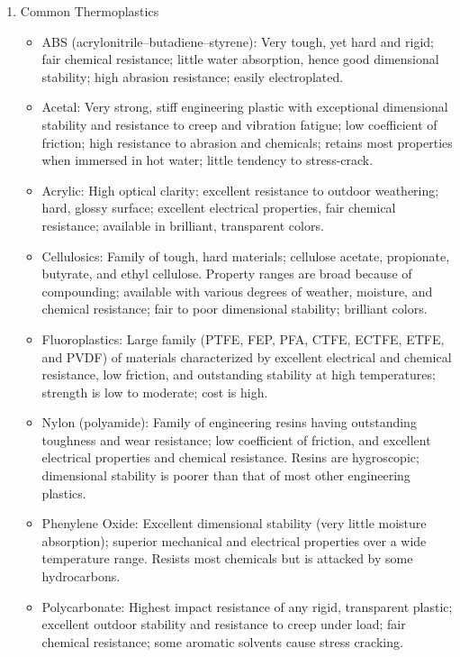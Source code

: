 \documentclass[a4paper,openany,nobib]{tufte-book}
\begin{document}
\begin{enumerate}
\item Common Thermoplastics
\label{common-thermoplastics}
\begin{itemize}
\item ABS (acrylonitrile--butadiene--styrene): Very tough, yet hard and
rigid; fair chemical resistance; little water absorption, hence good
dimensional stability; high abrasion resistance; easily electroplated.

\item Acetal: Very strong, stiff engineering plastic with exceptional
dimensional stability and resistance to creep and vibration fatigue;
low coefficient of friction; high resistance to abrasion and
chemicals; retains most properties when immersed in hot water; little
tendency to stress-crack.

\item Acrylic: High optical clarity; excellent resistance to outdoor
weathering; hard, glossy surface; excellent electrical properties,
fair chemical resistance; available in brilliant, transparent colors.

\item Cellulosics: Family of tough, hard materials; cellulose acetate,
propionate, butyrate, and ethyl cellulose. Property ranges are broad
because of compounding; available with various degrees of weather,
moisture, and chemical resistance; fair to poor dimensional stability;
brilliant colors.

\item Fluoroplastics: Large family (PTFE, FEP, PFA, CTFE, ECTFE, ETFE, and
PVDF) of materials characterized by excellent electrical and chemical
resistance, low friction, and outstanding stability at high
temperatures; strength is low to moderate; cost is high.

\item Nylon (polyamide): Family of engineering resins having outstanding
toughness and wear resistance; low coefficient of friction, and
excellent electrical properties and chemical resistance. Resins are
hygroscopic; dimensional stability is poorer than that of most other
engineering plastics.

\item Phenylene Oxide: Excellent dimensional stability (very little moisture
absorption); superior mechanical and electrical properties over a wide
temperature range. Resists most chemicals but is attacked by some
hydrocarbons.

\item Polycarbonate: Highest impact resistance of any rigid, transparent
plastic; excellent outdoor stability and resistance to creep under
load; fair chemical resistance; some aromatic solvents cause stress
cracking.


\end{itemize}
\end{enumerate}
\end{document}
